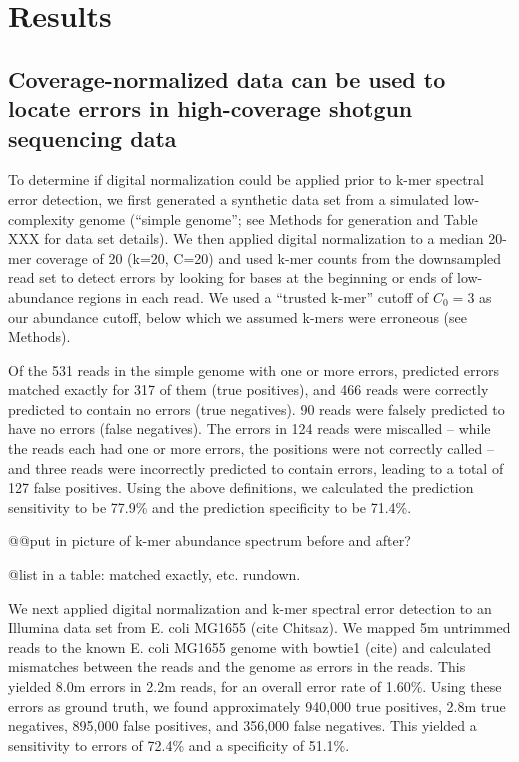 \documentclass{article}
\begin{document}
\section{Results}

\subsection{Coverage-normalized data can be used to locate
errors in high-coverage shotgun sequencing data}

To determine if digital normalization could be applied prior to k-mer
spectral error detection, we first generated a synthetic data set from
a simulated low-complexity genome (``simple genome''; see Methods for
generation and Table XXX for data set details).  We then applied
digital normalization to a median 20-mer coverage of 20 (k=20, C=20)
and used k-mer counts from the downsampled read set to detect errors
by looking for bases at the beginning or ends of low-abundance regions
in each read. We used a ``trusted k-mer'' cutoff of $C_0 = 3$ as our
abundance cutoff, below which we assumed k-mers were erroneous (see Methods).

Of the 531 reads in the simple genome with one or more errors,
predicted errors matched exactly for 317 of them (true positives), and
466 reads were correctly predicted to contain no errors (true
negatives). 90 reads were falsely predicted to have no errors (false
negatives). The errors in 124 reads were miscalled -- while the reads
each had one or more errors, the positions were not correctly called
-- and three reads were incorrectly predicted to contain errors,
leading to a total of 127 false positives.  Using the above
definitions, we calculated the prediction sensitivity to be 77.9\% and
the prediction specificity to be 71.4\%.

@@put in picture of k-mer abundance spectrum before and after?

@list in a table: matched exactly, etc. rundown.


We next applied digital normalization and k-mer spectral error
detection to an Illumina data set from E. coli MG1655 (cite Chitsaz).
We mapped 5m untrimmed reads to the known E. coli MG1655 genome with
bowtie1 (cite) and calculated mismatches between the reads and the
genome as errors in the reads.  This yielded 8.0m errors in 2.2m reads,
for an overall error rate of 1.60\%.  Using these errors as ground truth,
we found approximately 940,000 true positives, 2.8m true negatives,
895,000 false positives, and 356,000 false negatives.  This yielded
a sensitivity to errors of 72.4\% and a specificity of 51.1\%.
\end{document}
